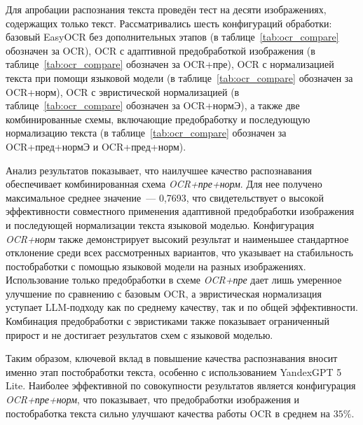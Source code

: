 Для апробации распознания текста проведён тест на десяти изображениях, содержащих только текст. Рассматривались шесть конфигураций обработки: базовый EasyOCR без дополнительных этапов (в таблице~\ref{tab:ocr_compare} обозначен за OCR), OCR с адаптивной предобработкой изображения (в таблице~\ref{tab:ocr_compare} обозначен за OCR+пре), OCR с нормализацией текста при помощи языковой модели (в таблице~\ref{tab:ocr_compare} обозначен за OCR+норм), OCR с эвристической нормализацией (в таблице~\ref{tab:ocr_compare} обозначен за OCR+нормЭ), а также две комбинированные схемы, включающие предобработку и последующую нормализацию текста (в таблице~\ref{tab:ocr_compare} обозначен за OCR+пред+нормЭ и OCR+пред+норм).

\begin{table}[t]
	\centering
	\small
	\setlength{\tabcolsep}{4pt}
	\renewcommand{\arraystretch}{1.15}
	\resizebox{\textwidth}{!}{
		
	}
	\label{tab:ocr_compare}
\end{table}

Анализ результатов показывает, что наилучшее качество распознавания обеспечивает комбинированная схема \textit{OCR+пре+норм}. Для нее получено максимальное среднее значение~--- 0,7693, что свидетельствует о высокой эффективности совместного применения адаптивной предобработки изображения и последующей нормализации текста языковой моделью.
Конфигурация \textit{OCR+норм} также демонстрирует высокий результат и наименьшее стандартное отклонение среди всех рассмотренных вариантов, что указывает на стабильность постобработки с помощью языковой модели на разных изображениях.
Использование только предобработки в схеме \textit{OCR+пре} дает лишь умеренное улучшение по сравнению с базовым OCR, а эвристическая нормализация уступает LLM-подходу как по среднему качеству, так и по общей эффективности. Комбинация предобработки с эвристиками также показывает ограниченный прирост и не достигает результатов схем с языковой моделью.

Таким образом, ключевой вклад в повышение качества распознавания вносит именно этап постобработки текста, особенно с использованием YandexGPT 5 Lite. Наиболее эффективной по совокупности результатов является конфигурация \textit{OCR+пре+норм}, что показывает, что предобработки изображения и постобработка текста сильно улучшают качества работы OCR в среднем на $35\%$.